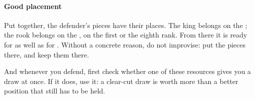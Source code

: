 \paragraph{Good placement}\label{good-placement}

Put together, the defender's pieces have their places. The king belongs on the
; the rook belongs on the , on the first or the eighth rank. From
there it is ready for  as well as for . Without a concrete
reason, do not improvise: put the pieces there, and keep them there.

And whenever you defend, first check whether one of these resources gives you a draw at once.
If it does, use it: a clear-cut draw is worth more than a better position that still
has to be held.
